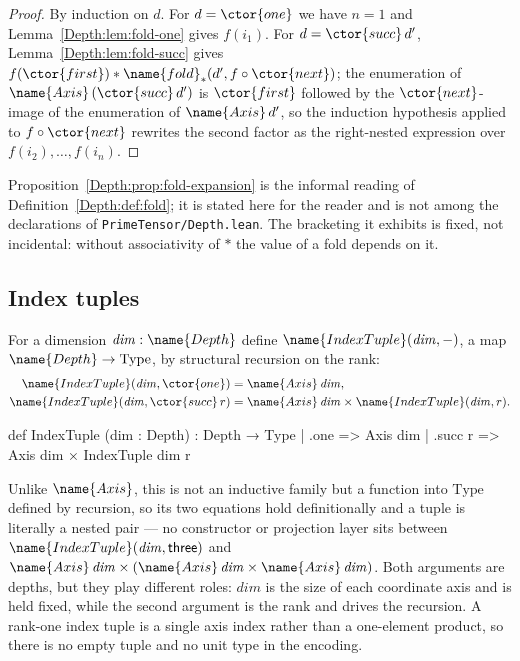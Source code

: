 \begin{proof}
By induction on $d$.  For $d = \ctor{one}$ we have $n = 1$ and
Lemma~\ref{Depth:lem:fold-one} gives $f(i_1)$.  For $d = \ctor{succ}\, d'$,
Lemma~\ref{Depth:lem:fold-succ} gives
$f(\ctor{first}) \ast \name{fold}_{\ast}(d', f \circ \ctor{next})$; the enumeration of
$\name{Axis}\,(\ctor{succ}\, d')$ is $\ctor{first}$ followed by the $\ctor{next}$-image of the
enumeration of $\name{Axis}\,d'$, so the induction hypothesis applied to
$f \circ \ctor{next}$ rewrites the second factor as the right-nested expression
over $f(i_2), \dots, f(i_n)$.
\end{proof}

\begin{remark}
Proposition~\ref{Depth:prop:fold-expansion} is the informal reading of
Definition~\ref{Depth:def:fold}; it is stated here for the reader and is not among
the declarations of \texttt{PrimeTensor/Depth.lean}.  The bracketing it
exhibits is fixed, not incidental: without associativity of $\ast$ the value
of a fold depends on it.
\end{remark}

\subsection{Index tuples}

\begin{definition}
\label{Depth:def:indextuple}
For a dimension $\mathit{dim} : \name{Depth}$ define $\name{IndexTuple}(\mathit{dim}, -)$, a
map $\name{Depth} \to \mathrm{Type}$, by structural recursion on the rank:
\begin{align*}
  \name{IndexTuple}(\mathit{dim}, \ctor{one})     &= \name{Axis}\,\mathit{dim}, \\
  \name{IndexTuple}(\mathit{dim}, \ctor{succ}\, r)   &= \name{Axis}\,\mathit{dim} \times
                                   \name{IndexTuple}(\mathit{dim}, r).
\end{align*}
\end{definition}

\begin{leancode}
def IndexTuple (dim : Depth) : Depth → Type
  | .one => Axis dim
  | .succ r => Axis dim × IndexTuple dim r
\end{leancode}

Unlike $\name{Axis}$, this is not an inductive family but a function into
$\mathrm{Type}$ defined by recursion, so its two equations hold
definitionally and a tuple is literally a nested pair --- no constructor or
projection layer sits between $\name{IndexTuple}(\mathit{dim}, \mathsf{three})$ and
$\name{Axis}\,\mathit{dim} \times (\name{Axis}\,\mathit{dim} \times \name{Axis}\,\mathit{dim})$.
Both arguments are depths, but they play different roles: $\mathit{dim}$ is
the size of each coordinate axis and is held fixed, while the second argument
is the rank and drives the recursion.  A rank-one index tuple is a single axis
index rather than a one-element product, so there is no empty tuple and no
unit type in the encoding.


